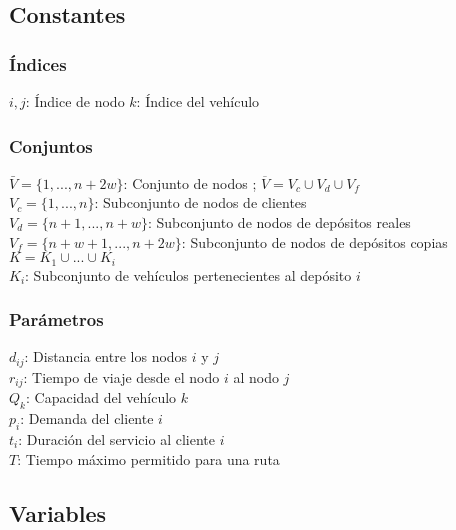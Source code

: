\documentclass[letter, 10pt]{article}
\begin{document}
\subsection{Constantes}

\subsubsection{Índices}

$i,j$: Índice de nodo
$k$: Índice del vehículo

\subsubsection{Conjuntos}

$\bar{V} = \{1, ...,n+2w\}$: Conjunto de nodos ; $ \overline{V} = V_{c} \cup V_{d} \cup V_{f}$\\

$V_{c} = \{1, ...,n\}$: Subconjunto de nodos de clientes\\

$V_{d} = \{n+1, ..., n+w\}$: Subconjunto de nodos de depósitos reales\\

$V_{f} = \{n+w+1, ..., n+2w\}$: Subconjunto de nodos de depósitos copias\\

$K = K_{1} \cup ... \cup K_{i}$\\

$K_{i}$: Subconjunto de vehículos pertenecientes al depósito $i$

\subsubsection{Parámetros}

$d_{ij}$: Distancia entre los nodos $i$ y $j$\\

$r_{ij}$: Tiempo de viaje desde el nodo $i$ al nodo $j$\\

$Q_{k}$: Capacidad del vehículo $k$\\

$p_{i}$: Demanda del cliente $i$\\

$t_{i}$: Duración del servicio al cliente $i$\\

$T$: Tiempo máximo permitido para una ruta

\subsection{Variables}
\end{document}
